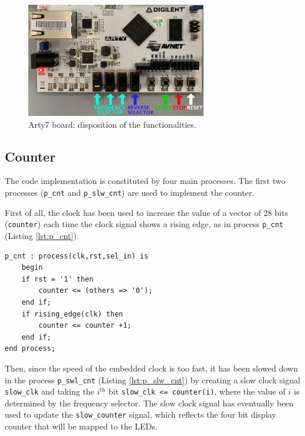 \documentclass[11pt, a4paper]{article}
\begin{document}
\begin{figure}[H]
\centering
\includegraphics[width=0.7\textwidth]{../main/image/board_implementation.pdf}
\caption{\label{fig:board_implementation} Arty7 board: disposition of the functionalities.}
\end{figure}


\clearpage
\subsection{Counter}
The code implementation is constituted by four main processes. The first two processes ({\footnotesize\texttt{p\_cnt}} and {\footnotesize\texttt{p\_slw\_cnt}}) are used to implement the counter.

First of all, the clock has been used to increase the value of a vector of 28 bits ({\footnotesize\texttt{counter}}) each time the clock signal shows a rising edge, as in process {\footnotesize\texttt{p\_cnt}} (Listing \ref{lst:p_cnt}).

\begin{lstlisting}[style=vhdl,label={lst:p_cnt},caption={{\footnotesize\texttt{p\_cnt}} process.}]
p_cnt : process(clk,rst,sel_in) is
    begin
    if rst = '1' then
        counter <= (others => '0');
    end if;
    if rising_edge(clk) then
        counter <= counter +1;
    end if;
end process;\end{lstlisting}

Then, since the speed of the embedded clock is too fast, it has been slowed down in the process {\footnotesize\texttt{p\_swl\_cnt}} (Listing \ref{lst:p_slw_cnt}) by creating a slow clock signal {\footnotesize\texttt{slow\_clk}} and taking the \(i^\text{th}\) bit {\footnotesize\texttt{slow\_clk <= counter(i)}}, where the value of \(i\) is determined by the frequency selector.
The slow clock signal has eventually been used to update the {\footnotesize\texttt{slow\_counter}} signal, which reflects the four bit display counter that will be mapped to the LEDs.
\end{document}
